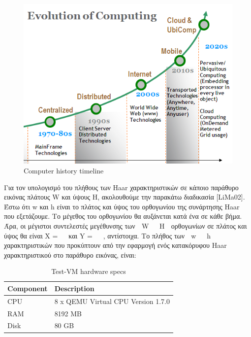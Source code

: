 \begin{figure}[htbp]
  \begin{center}
    \includegraphics[width=0.75\maxwidth]{../figures/comp_evol.png}
    \caption{Computer history timeline\label{fig:comp_evol}}
   \end{center}
\end{figure}

Για τον υπολογισμό του πλήθους των Haar χαρακτηριστικών σε κάποιο παράθυρο εικόνας
πλάτους W και ύψους H, ακολουθούμε την παρακάτω διαδικασία [LiMa02]. Έστω ότι w και h
είναι το πλάτος και ύψος του ορθογωνίου της συνάρτησης Haar που εξετάζουμε. Το μέγεθος του
ορθογωνίου θα αυξάνεται κατά ένα σε κάθε βήμα. Άρα, οι μέγιστοι συντελεστές μεγέθυνσης των
 W 
 H 
ορθογωνίων σε πλάτος και ύψος θα είναι X =   και Y =   , αντίστοιχα. Το πλήθος των
 w 
 h 
χαρακτηριστικών που προκύπτουν από την εφαρμογή ενός κατακόρυφου Haar χαρακτηριστικού
στο παράθυρο εικόνας, είναι:


\begin{table}[htbp]
  \centering
  \begin{tabular}{ | l | l | }
    \hline
    Component & Description \\ \hline \hline
    CPU & 8 x QEMU Virtual CPU Version 1.7.0 \\
    \hline
    RAΜ & 8192 MB  \\
    \hline
    Disk & 80 GB \\
    \hline
  \end{tabular}
  \caption{Test-VM hardware specs}
  \label{tab:hw-specs}
\end{table}


